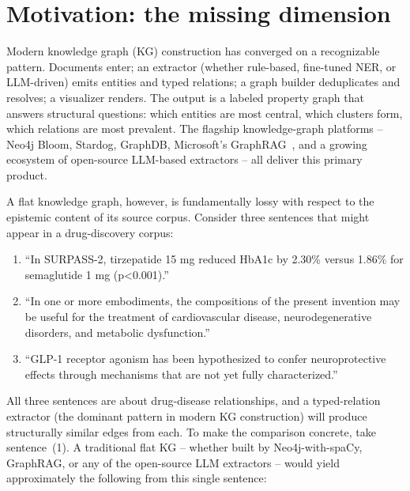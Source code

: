 \section{Motivation: the missing dimension}
\label{sec:motivation}

Modern knowledge graph (KG) construction has converged on a recognizable pattern. Documents enter; an extractor (whether rule-based, fine-tuned NER, or LLM-driven) emits entities and typed relations; a graph builder deduplicates and resolves; a visualizer renders. The output is a labeled property graph that answers structural questions: which entities are most central, which clusters form, which relations are most prevalent. The flagship knowledge-graph platforms -- Neo4j Bloom, Stardog, GraphDB, Microsoft's GraphRAG~\cite{edge2024graphrag}, and a growing ecosystem of open-source LLM-based extractors -- all deliver this primary product.

A flat knowledge graph, however, is fundamentally lossy with respect to the epistemic content of its source corpus. Consider three sentences that might appear in a drug-discovery corpus:

\begin{enumerate}
\item ``In SURPASS-2, tirzepatide 15 mg reduced HbA1c by 2.30\% versus 1.86\% for semaglutide 1 mg (p<0.001).'' \cite{frias2021surpass2}
\item ``In one or more embodiments, the compositions of the present invention may be useful for the treatment of cardiovascular disease, neurodegenerative disorders, and metabolic dysfunction.''
\item ``GLP-1 receptor agonism has been hypothesized to confer neuroprotective effects through mechanisms that are not yet fully characterized.''
\end{enumerate}

All three sentences are about drug-disease relationships, and a typed-relation extractor (the dominant pattern in modern KG construction) will produce structurally similar edges from each. To make the comparison concrete, take sentence~(1). A traditional flat KG -- whether built by Neo4j-with-spaCy, GraphRAG, or any of the open-source LLM extractors -- would yield approximately the following from this single sentence:

